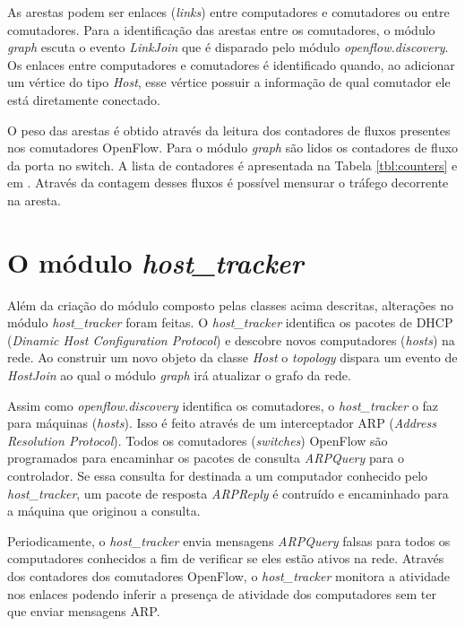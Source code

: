 As arestas podem ser enlaces (\emph{links}) entre computadores e comutadores ou
entre comutadores.
Para a identificação das arestas entre os comutadores, o módulo \emph{graph} 
escuta o evento \emph{LinkJoin} que é disparado pelo módulo 
\emph{openflow.discovery}.
Os enlaces entre computadores e comutadores é identificado quando, ao 
adicionar um vértice do tipo \emph{Host}, esse vértice possuir a informação
de qual comutador ele está diretamente conectado.

O peso das arestas é obtido através da leitura dos contadores de fluxos 
presentes nos comutadores OpenFlow.
Para o módulo \emph{graph} são lidos os contadores de fluxo da porta 
no switch. 
A lista de contadores é apresentada na Tabela \ref{tbl:counters} e em 
\citep{ofprotocol2015}.
Através da contagem desses fluxos é possível mensurar o tráfego 
decorrente na aresta.



\section{O módulo \emph{host\_tracker}}

Além da criação do módulo composto pelas classes acima descritas, alterações
no módulo \emph{host\_tracker} foram feitas.
O \emph{host\_tracker} identifica os pacotes de DHCP (\emph{Dinamic Host
Configuration Protocol}) e descobre novos computadores (\emph{hosts}) na rede.
Ao construir um novo objeto da classe \emph{Host} o \emph{topology} dispara
um evento de \emph{HostJoin} ao qual o módulo \emph{graph} irá atualizar
o grafo da rede.

Assim como \emph{openflow.discovery} identifica os comutadores, o 
\emph{host\_tracker} o faz para máquinas (\emph{hosts}).
Isso é feito através de um interceptador ARP (\emph{Address Resolution 
Protocol}).
Todos os comutadores (\emph{switches}) OpenFlow são programados para encaminhar
os pacotes de consulta \emph{ARPQuery} para o controlador.
Se essa consulta for destinada a um computador conhecido pelo
\emph{host\_tracker}, um pacote de resposta \emph{ARPReply} é contruído e 
encaminhado para a máquina que originou a consulta.

Periodicamente, o \emph{host\_tracker} envia mensagens \emph{ARPQuery} falsas
para todos os computadores conhecidos a fim de verificar se eles estão ativos
na rede.
Através dos contadores dos comutadores OpenFlow, o \emph{host\_tracker} 
monitora a atividade nos enlaces podendo inferir a presença de atividade
dos computadores sem ter que enviar mensagens ARP.

